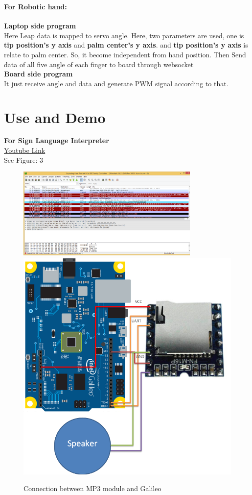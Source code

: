 \documentclass[a4paper,12pt,oneside]{book}
\begin{document}
\vspace{.3cm}
\textbf{For Robotic hand:}\\
\vspace{.3cm}\\
\textbf{Laptop side program}\\
Here Leap data is mapped to servo angle. Here, two parameters are used, one is \textbf{tip position's y axis} and \textbf{palm center's y axis}. and \textbf{tip position's y axis} is relate to palm center. So, it become independent from hand position. Then Send data of all five angle of each finger to board through websocket\\
\textbf{Board side program}\\
It just receive angle and data and generate PWM signal according to that.
\section{Use and Demo}
\textbf{For Sign Language Interpreter}\\
\href{https://youtu.be/sPYWe_E_F5w}{Youtube Link}\\
See Figure: 3\\
\begin{figure}
  \includegraphics[width=9cm]{3.png}
  \includegraphics[width=12cm]{5.png}
  \caption{Connection between MP3 module and Galileo}
\end{figure}
\end{document}
